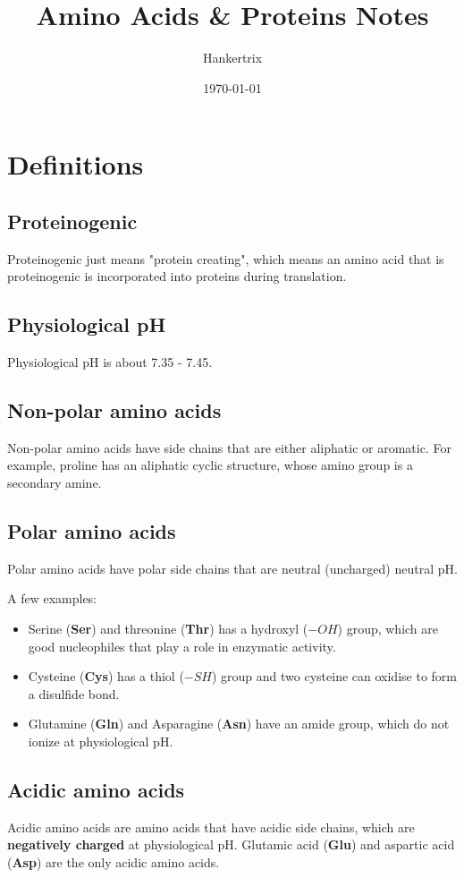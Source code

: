 \documentclass[11pt]{article}
\author{Hankertrix}
\date{\today}
\title{Amino Acids \& Proteins Notes}
\begin{document}
\maketitle
\setcounter{tocdepth}{2}
\tableofcontents \clearpage\section{Definitions}
\label{sec:orgaed9b04}

\subsection{Proteinogenic}
\label{sec:orge7ae9d3}
Proteinogenic just means "protein creating", which means an amino acid that is proteinogenic is incorporated into proteins during translation.
\subsection{Physiological pH}
\label{sec:org3a5c7f9}
Physiological pH is about 7.35 - 7.45.
\subsection{Non-polar amino acids}
\label{sec:orgee4c63c}
Non-polar amino acids have side chains that are either aliphatic or aromatic. For example, proline has an aliphatic cyclic structure, whose amino group is a secondary amine.
\subsection{Polar amino acids}
\label{sec:org06d2433}
Polar amino acids have polar side chains that are neutral (uncharged) neutral pH.

A few examples:
\begin{itemize}
\item Serine (\textbf{Ser}) and threonine (\textbf{Thr}) has a hydroxyl (\(-OH\)) group, which are good nucleophiles that play a role in enzymatic activity.
\item Cysteine (\textbf{Cys}) has a thiol (\(-SH\)) group and two cysteine can oxidise to form a disulfide bond.
\item Glutamine (\textbf{Gln}) and Asparagine (\textbf{Asn}) have an amide group, which do not ionize at physiological pH.
\end{itemize}
\subsection{Acidic amino acids}
\label{sec:org0cc2453}
Acidic amino acids are amino acids that have acidic side chains, which are \textbf{negatively charged} at physiological pH. Glutamic acid (\textbf{Glu}) and aspartic acid (\textbf{Asp}) are the only acidic amino acids.
\end{document}
